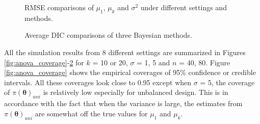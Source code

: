 \documentclass[Proceedings]{ascelike}
\begin{document}
\begin{figure}[h!]
\centering
{}
\caption{RMSE comparisons of $\mu_1$, $\mu_k$ and $\sigma^2$ under different settings and methods.}
\label{fig:anova_rmse}
\end{figure}
\begin{figure}[h!]
\centering
{}
\caption{Average DIC comparisons of three Bayesian methods.}
\label{fig:DIC_ano}
\end{figure}


All the simulation results from 8 different settings are summarized in Figures \ref{fig:anova_coverage}-\ref{fig:DIC_ano} for $k$ = 10 or 20, $\sigma$ = 1, 5 and $n$ = 40, 80. Figure \ref{fig:anova_coverage} shows the empirical coverages of 95\% confidence or credible intervals. All these coverages look close to 0.95 except when $\sigma$ = 5, the coverage of $\pi(\pmb\theta)_{uni}$ is relatively low especially for unbalanced design. This is in accordance with the fact that when the variance is large, the estimates from $\pi(\pmb\theta)_{uni}$ are somewhat off the true values for $\mu_1$ and $\mu_k$. 
\end{document}
